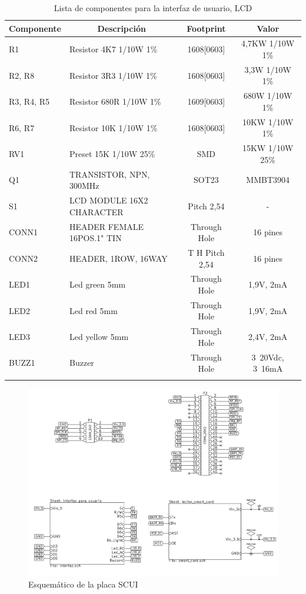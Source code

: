 \newpage
\begin{longtable}{|l|l|c|c|}
\hline
\multicolumn{1}{|c|}{\textbf{Componente}} & \multicolumn{1}{c|}{\textbf{Descripción}} & \textbf{ Footprint} & \textbf{Valor} \\ \hline
R1 & Resistor 4K7    1/10W     1\% & 1608[0603] & 4,7KW  1/10W   1\% \\ \hline
R2, R8 & Resistor 3R3    1/10W     1\% & 1608[0603] & 3,3W    1/10W   1\% \\ \hline
R3, R4, R5 & Resistor 680R  1/10W     1\% & 1609[0603] & 680W   1/10W   1\% \\ \hline
R6, R7 & Resistor 10K    1/10W     1\% & 1608[0603] & 10KW  1/10W   1\% \\ \hline
RV1 & Preset 15K        1/10W  25\% & SMD & 15KW   1/10W  25\% \\ \hline
Q1 & TRANSISTOR, NPN, 300MHz & SOT23 & MMBT3904 \\ \hline
S1 & LCD MODULE 16X2 CHARACTER & Pitch 2,54 & - \\ \hline
CONN1 & HEADER FEMALE 16POS.1" TIN & Through Hole & 16 pines \\ \hline
CONN2 & HEADER, 1ROW, 16WAY & T H Pitch 2,54 & 16 pines \\ \hline
LED1 & Led green 5mm & Through Hole & 1,9V,  2mA \\ \hline
LED2 & Led red 5mm & Through Hole & 1,9V,  2mA \\ \hline
LED3 & Led yellow 5mm & Through Hole & 2,4V,  2mA \\ \hline
BUZZ1 & Buzzer & Through Hole & 3~20Vdc, 3~16mA \\ \hline
\caption{Lista de componentes para la interfaz de usuario, LCD}
\label{}
\end{longtable}

\begin{figure}[H]
\centering
  \begin{center}
   \includegraphics[scale=1]{Imagenes/scui.png}
  \end{center}
  \caption{Esquemático de la placa SCUI}\label{Fig:SCUI} 
\end{figure}

